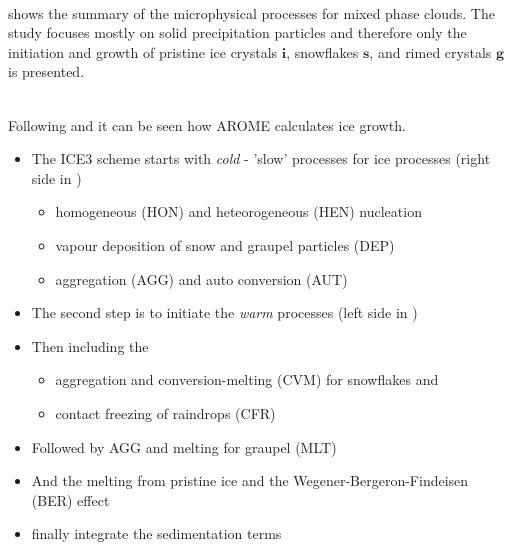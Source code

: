 %
%
\\
 shows the summary of the microphysical processes for mixed phase clouds. The study focuses mostly on solid precipitation particles and therefore only the initiation and growth of pristine ice crystals $\mathbf{i}$, snowflakes $\mathbf{s}$, and rimed crystals $\mathbf{g}$ is presented. 

\noindent
\\
Following \cite{pinty_mixed-phased_1998} and  it can be seen how AROME calculates ice growth. %
\begin{itemize}
	\item The ICE3 scheme starts with \textit{cold} - 'slow' processes for ice processes (right side in ) 
	\begin{itemize}
		\item homogeneous (HON) and heteorogeneous (HEN) nucleation
		\item vapour deposition of snow and graupel particles (DEP)
		\item aggregation (AGG) and auto conversion (AUT)
	\end{itemize}
	\item The second step is to initiate the \textit{warm} processes (left side in )
	\item Then including the 
	\begin{itemize}
		\item aggregation and conversion-melting (CVM) for snowflakes and 
		\item contact freezing of raindrops (CFR)
	\end{itemize}
	\item Followed by AGG and melting for graupel (MLT)
	\item And the melting from pristine ice and the Wegener-Bergeron-Findeisen (BER) effect
	\item finally integrate the sedimentation terms
\end{itemize}


